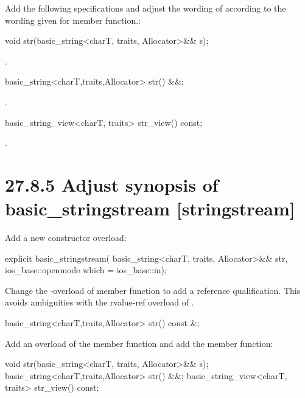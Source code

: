 \documentclass[ebook,11pt,article]{memoir}
\begin{document}
Add the following specifications and adjust the wording of  according to the wording given for  member function.:
\begin{itemdecl}
void str(basic_string<charT, traits, Allocator>&& s);
\end{itemdecl}
\begin{itemdescr}
\pnum
\effects {}.
\end{itemdescr}
\begin{itemdecl}
basic_string<charT,traits,Allocator> str() &&;
\end{itemdecl}
\begin{itemdescr}
\pnum
\returns {}.
\end{itemdescr}
\begin{itemdecl}
basic_string_view<charT, traits> str_view() const;
\end{itemdecl}
\begin{itemdescr}
\pnum
\returns {}.
\end{itemdescr}

\section{27.8.5 Adjust synopsis of basic\_stringstream [stringstream]}
Add a new constructor overload:
\begin{codeblock}
           explicit basic_stringstream(
             basic_string<charT, traits, Allocator>&& str,
             ios_base::openmode which = ios_base::in);
\end{codeblock}

Change the -overload of  member function to add a reference qualification. This avoids ambiguities with the rvalue-ref overload of .  
\begin{codeblock}
basic_string<charT,traits,Allocator> str() const &;
\end{codeblock}

Add an overload of the  member function and add the  member function:
\begin{codeblock}
void str(basic_string<charT, traits, Allocator>&& s);
basic_string<charT,traits,Allocator> str() &&;
basic_string_view<charT, traits> str_view() const;
\end{codeblock}
\end{document}
